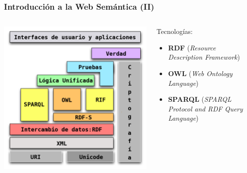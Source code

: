 \documentclass[spanish,notes=hide]{beamer}
\begin{document}
{
  \frametitle{Introducción a la Web Semántica (II)}

  \begin{columns}
    \begin{column}{0.6\textwidth}
	\includegraphics[width=\textwidth]{images/pila-web-semantica.png}
    \end{column}
    \begin{column}{0.4\textwidth}
      Tecnologías:
      \begin{itemize}
	\item \textbf{RDF} (\textit{Resource Description Framework})
	\item \textbf{OWL} (\textit{Web Ontology Language})
	\item \textbf{SPARQL} (\textit{SPARQL Protocol and RDF Query Language})
      \end{itemize}
    \end{column}
  \end{columns}
}
\frame
\end{document}
